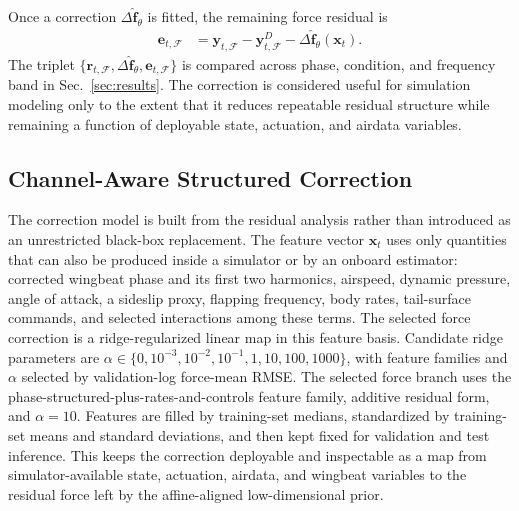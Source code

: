 Once a correction $\Delta\hat{\mathbf{f}}_{\theta}$ is fitted, the remaining force residual is
\begin{equation}
  \begin{aligned}
  \mathbf{e}_{t,\mathcal{F}}
  &=
  \mathbf{y}_{t,\mathcal{F}}
  - \mathbf{y}^{D}_{t,\mathcal{F}}
  - \Delta\hat{\mathbf{f}}_{\theta}(\mathbf{x}_t) .
  \end{aligned}
  \label{eq:residual_triplet}
\end{equation}
The triplet $\{\mathbf{r}_{t,\mathcal{F}}, \Delta\hat{\mathbf{f}}_{\theta}, \mathbf{e}_{t,\mathcal{F}}\}$ is compared across phase, condition, and frequency band in Sec.~\ref{sec:results}. The correction is considered useful for simulation modeling only to the extent that it reduces repeatable residual structure while remaining a function of deployable state, actuation, and airdata variables.

\subsection{Channel-Aware Structured Correction}
\label{subsec:residual_learning}

The correction model is built from the residual analysis rather than introduced as an unrestricted black-box replacement. The feature vector $\mathbf{x}_t$ uses only quantities that can also be produced inside a simulator or by an onboard estimator: corrected wingbeat phase and its first two harmonics, airspeed, dynamic pressure, angle of attack, a sideslip proxy, flapping frequency, body rates, tail-surface commands, and selected interactions among these terms. The selected force correction is a ridge-regularized linear map in this feature basis. Candidate ridge parameters are $\alpha\in\{0,10^{-3},10^{-2},10^{-1},1,10,100,1000\}$, with feature families and $\alpha$ selected by validation-log force-mean RMSE. The selected force branch uses the phase-structured-plus-rates-and-controls feature family, additive residual form, and $\alpha=10$. Features are filled by training-set medians, standardized by training-set means and standard deviations, and then kept fixed for validation and test inference. This keeps the correction deployable and inspectable as a map from simulator-available state, actuation, airdata, and wingbeat variables to the residual force left by the affine-aligned low-dimensional prior.

